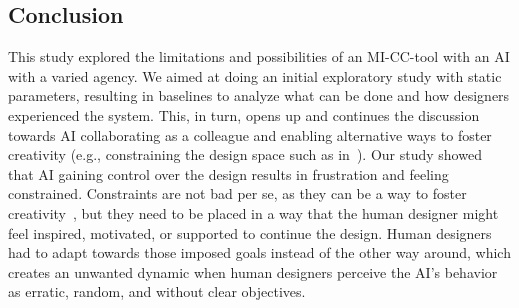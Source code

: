 


\subsection{Conclusion}

This study explored the limitations and possibilities of an MI-CC-tool with an AI with a varied agency. We aimed at doing an initial exploratory study with static parameters, resulting in baselines to analyze what can be done and how designers experienced the system. This, in turn, opens up and continues the discussion towards AI collaborating as a colleague and enabling alternative ways to foster creativity (e.g., constraining the design space such as in~\cite{p13bhaumik_lode_2021}). Our study showed that AI gaining control over the design results in frustration and feeling constrained. Constraints are not bad per se, as they can be a way to foster creativity~\cite{p13boden_creative_2004,acar_creativity_2019}, but they need to be placed in a way that the human designer might feel inspired, motivated, or supported to continue the design. Human designers had to adapt towards those imposed goals instead of the other way around, which creates an unwanted dynamic when human designers perceive the AI's behavior as erratic, random, and without clear objectives.




